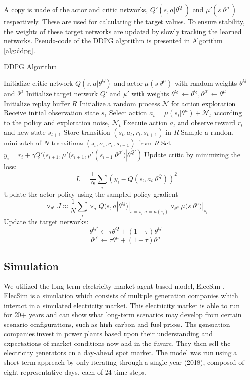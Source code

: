 \documentclass[conference]{IEEEtran}
\begin{document}
A copy is made of the actor and critic networks, $Q'(s,a|\theta^{Q'})$ and $\mu'(s|\theta^{\mu'})$ respectively. These are used for calculating the target values. To ensure stability, the weights of these target networks are updated by slowly tracking the learned networks. Pseudo-code of the DDPG algorithm is presented in Algorithm \ref{alg:ddpg}.

\begin{algorithm}
\caption{DDPG Algorithm \cite{Hunt2016a}}
\begin{algorithmic}[1]
  \footnotesize
  \STATE Initialize critic network $Q(s,a|\theta^Q)$ and actor $\mu(s|\theta^\mu)$ with random weights $\theta^Q$ and $\theta^\mu$
  \STATE Initialize target network $Q'$ and $\mu'$ with weights $\theta^{Q'}\leftarrow\theta^Q,\theta^{\mu'}\leftarrow \theta^{\mu}$
  \STATE Initialize replay buffer $R$
        \STATE Initialize a random process $\mathcal{N}$ for action exploration
        \STATE Receive initial observation state $s_1$
        	\STATE Select action $a_t=\mu(s_t|\theta^{\mu})+\mathcal{N}_t$ according to the policy and exploration noise, $\mathcal{N}_t$
        	\STATE Execute action $a_t$ and observe reward $r_t$ and new state $s_{t+1}$
        	\STATE Store transition $(s_t, a_t, r_t, s_{t+1})$ in $R$
        	\STATE Sample a random minibatch of $N$ transitions $(s_i, a_i, r_i, s_{i+1})$ from $R$
        	\STATE Set $y_i=r_i+\gamma Q'(s_{i+1},\mu'(s_{i+1},\mu'(s_{i+1}|\theta^{\mu'})|\theta^{Q'})$
        	\STATE Update critic by minimizing the loss: $$L=\frac{1}{N}\sum_i(y_i-Q(s_i,a_i|\theta^Q))^2$$
        	\STATE Update the actor policy using the sampled policy gradient: $$\triangledown_{\theta^\mu}J\approx \frac{1}{N}\sum_i\triangledown_a Q(s,a|\theta^Q)|_{s=s_i,a=\mu(s_i)}\triangledown_{\theta^\mu}\mu(s|\theta^\mu)|_{s_i}$$
        	\STATE Update the target networks:
        	$$\theta^{Q'}\leftarrow\tau\theta^Q+(1-\tau)\theta^{Q'}$$
        	$$\theta^{\mu'}\leftarrow\tau\theta^\mu+(1-\tau)\theta^{\mu'}$$
        \ENDFOR
      \ENDFOR
\end{algorithmic}
\label{alg:ddpg}
\end{algorithm}

\subsection{Simulation}

We utilized the long-term electricity market agent-based model, ElecSim \cite{Kell,Kell2020}. ElecSim is a simulation which consists of multiple generation companies which interact in a simulated electricity market. This electricity market is able to run for 20+ years and can show what long-term scenarios may develop from certain scenario configurations, such as high carbon and fuel prices. The generation companies invest in power plants based upon their understanding and expectations of market conditions now and in the future. They then sell the electricity generators on a day-ahead spot market. The model was run using a short term approach by only iterating through a single year (2018), composed of eight representative days, each of 24 time steps.
\end{document}
